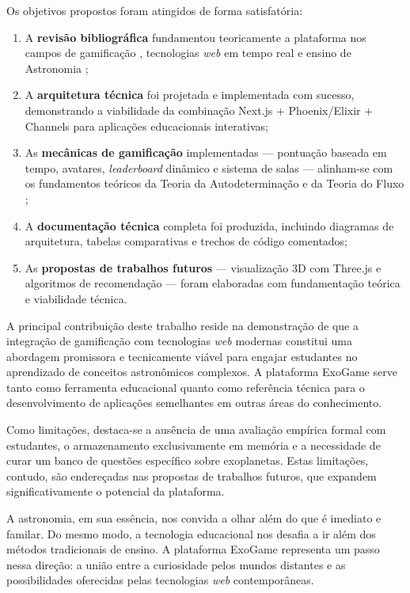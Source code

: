 \documentclass[
	12pt,
	openany,
	oneside,
	a4paper,
	english,
	brazil
]{abntex2}
\begin{document}
Os objetivos propostos foram atingidos de forma satisfatória:

\begin{enumerate}
  \item A \textbf{revisão bibliográfica} fundamentou teoricamente a plataforma nos campos de gamificação \cite{kapp2012, deterding2011, hamari2014}, tecnologias \textit{web} em tempo real \cite{lubbers2010, puranik2024} e ensino de Astronomia \cite{langhi2009};
  
  \item A \textbf{arquitetura técnica} foi projetada e implementada com sucesso, demonstrando a viabilidade da combinação Next.js + Phoenix/Elixir + Channels para aplicações educacionais interativas;
  
  \item As \textbf{mecânicas de gamificação} implementadas --- pontuação baseada em tempo, avatares, \textit{leaderboard} dinâmico e sistema de salas --- alinham-se com os fundamentos teóricos da Teoria da Autodeterminação \cite{ryan2000} e da Teoria do Fluxo \cite{csikszentmihalyi1990};
  
  \item A \textbf{documentação técnica} completa foi produzida, incluindo diagramas de arquitetura, tabelas comparativas e trechos de código comentados;
  
  \item As \textbf{propostas de trabalhos futuros} --- visualização 3D com Three.js e algoritmos de recomendação --- foram elaboradas com fundamentação teórica e viabilidade técnica.
\end{enumerate}

A principal contribuição deste trabalho reside na demonstração de que a integração de gamificação com tecnologias \textit{web} modernas constitui uma abordagem promissora e tecnicamente viável para engajar estudantes no aprendizado de conceitos astronômicos complexos. A plataforma ExoGame serve tanto como ferramenta educacional quanto como referência técnica para o desenvolvimento de aplicações semelhantes em outras áreas do conhecimento.

Como limitações, destaca-se a ausência de uma avaliação empírica formal com estudantes, o armazenamento exclusivamente em memória e a necessidade de curar um banco de questões específico sobre exoplanetas. Estas limitações, contudo, são endereçadas nas propostas de trabalhos futuros, que expandem significativamente o potencial da plataforma.

A astronomia, em sua essência, nos convida a olhar além do que é imediato e familar. Do mesmo modo, a tecnologia educacional nos desafia a ir além dos métodos tradicionais de ensino. A plataforma ExoGame representa um passo nessa direção: a união entre a curiosidade pelos mundos distantes e as possibilidades oferecidas pelas tecnologias \textit{web} contemporâneas.
\end{document}
